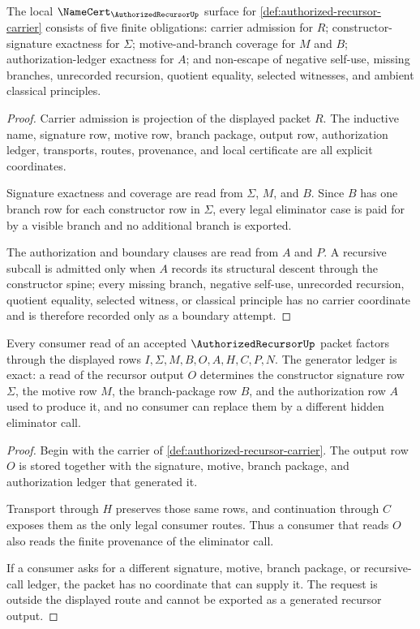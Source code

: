 \begin{theorem}
\label{thm:authorized-recursor-namecert-obligations}
The local $\NameCert_{\AuthorizedRecursorUp}$ surface for \autoref{def:authorized-recursor-carrier} consists of five finite obligations: carrier admission for $R$; constructor-signature exactness for $\Sigma$; motive-and-branch coverage for $M$ and $B$; authorization-ledger exactness for $A$; and non-escape of negative self-use, missing branches, unrecorded recursion, quotient equality, selected witnesses, and ambient classical principles.
\end{theorem}
\begin{proof}
Carrier admission is projection of the displayed packet $R$. The inductive name, signature row, motive row, branch package, output row, authorization ledger, transports, routes, provenance, and local certificate are all explicit coordinates.

Signature exactness and coverage are read from $\Sigma$, $M$, and $B$. Since $B$ has one branch row for each constructor row in $\Sigma$, every legal eliminator case is paid for by a visible branch and no additional branch is exported.

The authorization and boundary clauses are read from $A$ and $P$. A recursive subcall is admitted only when $A$ records its structural descent through the constructor spine; every missing branch, negative self-use, unrecorded recursion, quotient equality, selected witness, or classical principle has no carrier coordinate and is therefore recorded only as a boundary attempt.
\end{proof}

\begin{theorem}
\label{thm:authorized-recursor-generator-ledger-exactness}
Every consumer read of an accepted $\AuthorizedRecursorUp$ packet factors through the displayed rows $I,\Sigma,M,B,O,A,H,C,P,N$. The generator ledger is exact: a read of the recursor output $O$ determines the constructor signature row $\Sigma$, the motive row $M$, the branch-package row $B$, and the authorization row $A$ used to produce it, and no consumer can replace them by a different hidden eliminator call.
\end{theorem}
\begin{proof}
Begin with the carrier of \autoref{def:authorized-recursor-carrier}. The output row $O$ is stored together with the signature, motive, branch package, and authorization ledger that generated it.

Transport through $H$ preserves those same rows, and continuation through $C$ exposes them as the only legal consumer routes. Thus a consumer that reads $O$ also reads the finite provenance of the eliminator call.

If a consumer asks for a different signature, motive, branch package, or recursive-call ledger, the packet has no coordinate that can supply it. The request is outside the displayed route and cannot be exported as a generated recursor output.
\end{proof}

